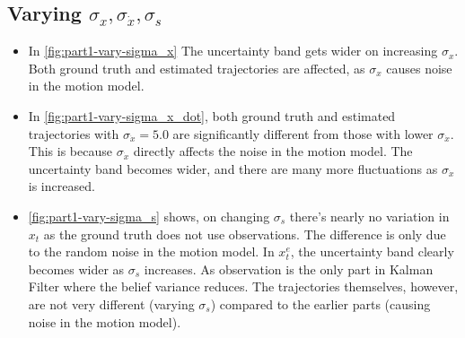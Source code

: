 \subsection{Varying $\sigma_x, \sigma_{\dot{x}},
\sigma_s$}
\begin{itemize}
    \item In \autoref{fig:part1-vary-sigma_x}
    The uncertainty band gets wider on increasing $\sigma_x$. Both ground truth and estimated trajectories are affected, as $\sigma_x$ causes noise in the motion model. 
    
\item In \autoref{fig:part1-vary-sigma_x_dot}, both ground truth and estimated trajectories with $\sigma_{\dot{x}} = 5.0$ are significantly different from those with lower $\sigma_{\dot{x}}$. This is because $\sigma_{\dot{x}}$ directly affects the noise in the motion model. The uncertainty band becomes wider, and there are many more fluctuations as $\sigma_{\dot{x}}$ is increased.

 
    \item \autoref{fig:part1-vary-sigma_s} shows, on changing $\sigma_s$ there's nearly no variation in $x_t$ as the ground truth does not use observations. The difference is only due to the random noise in the motion model. In $x_t^e$, the uncertainty band clearly becomes wider as $\sigma_s$ increases. As observation is the only part in Kalman Filter where the belief variance reduces. The trajectories themselves, however, are not very different (varying $\sigma_s$) compared to the earlier parts (causing noise in the motion model).
\end{itemize}
